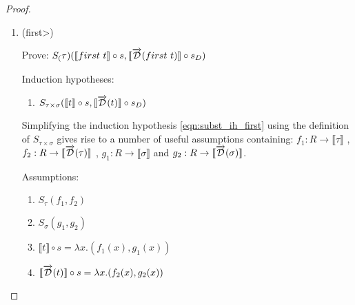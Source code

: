 \documentclass[11pt, final]{article}
\begin{document}
\begin{proof}
\begin{enumerate}
\begin{align*}
        & \Vdash \text{(Give witnesses of $S_\tau$ and $S_\sigma$ using respective IHs \ref{eqn:subst_ih_tuple1} and \ref{eqn:subst_ih_tuple2})} \\
        & \;\;\;\;\lambda x. (\llbracket t_1 \rrbracket(s(x)), \llbracket t_2 \rrbracket(s(x))) \\
        & \;\;\;\;\;\;\; = \lambda x. (\llbracket t_1 \rrbracket(s(x)), \llbracket t_2 \rrbracket(s(x))) \wedge \\
        & \;\;\;\;\lambda x. (\llbracket \D(t_1) \rrbracket(s'(x)), \llbracket \D(t_2) \rrbracket(s'(x))) \\
        & \;\;\;\;\;\;\; = \lambda x. (\llbracket \D(t_1) \rrbracket(s'(x)), \llbracket \D(t_2) \rrbracket(s'(x))) \\
        & \Vdash \text{(Reflexivity)} \\
      \end{align*}\qed
      \item (\<first>)

      Prove: $S_(\tau)(\llbracket first\ t \rrbracket \circ s, \llbracket \overrightarrow{\mathcal{D}}(first\ t) \rrbracket \circ s_D)$

      Induction hypotheses:
      \begin{enumerate}
        \item \label{eqn:subst_ih_first}$S_{\tau\times\sigma}(\llbracket t \rrbracket \circ s, \llbracket \overrightarrow{\mathcal{D}}(t) \rrbracket \circ s_D)$
      \end{enumerate}

      Simplifying the induction hypothesis \ref{eqn:subst_ih_first} using the definition of $S_{\tau\times\sigma}$ gives rise to a number of useful assumptions containing:
      $f_1 : R \rightarrow \llbracket \tau \rrbracket$
      , $f_2 : R \rightarrow \llbracket \overrightarrow{\mathcal{D}}(\tau) \rrbracket$
      , $g_1 : R \rightarrow \llbracket \sigma \rrbracket$
      and $g_2 : R \rightarrow \llbracket \overrightarrow{\mathcal{D}}(\sigma) \rrbracket$.

      Assumptions:
      \begin{enumerate}
        \item \label{eqn:subst_ass_proj1_4} $S_\tau(f_1, f_2)$
        \item \label{eqn:subst_ass_proj1_5} $S_\sigma(g_1, g_2)$
        \item \label{eqn:subst_ass_proj1_6} $\llbracket t \rrbracket \circ s = \lambda x. (f_1(x), g_1(x))$
        \item \label{eqn:subst_ass_proj1_7} $\llbracket \overrightarrow{\mathcal{D}}(t) \rrbracket \circ s = \lambda x. (f_2(x), g_2(x))$
      \end{enumerate}


\end{enumerate}
\end{proof}
\end{document}
